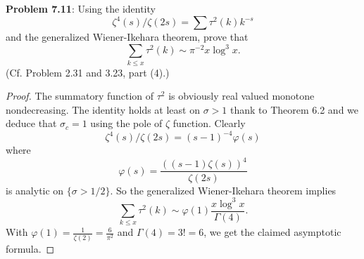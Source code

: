 \documentclass[12pt]{article}
\begin{document}
\fi

\textbf{Problem 7.11}: Using the identity
$$\zeta^4(s)/\zeta(2s) = \sum \tau^2(k) k^{-s}$$
and the generalized Wiener-Ikehara theorem, prove that
$$\sum_{k \leq x} \tau^2(k) \sim \pi^{-2} x \log^3 x.$$
(Cf. Problem 2.31 and 3.23, part (4).)

\begin{proof}
The summatory function of $\tau^2$ is obviously real valued monotone nondecreasing. The identity holds at least on $\sigma > 1$ thank to Theorem 6.2 and we deduce that $\sigma_c = 1$ using the pole of $\zeta$ function. Clearly
$$\zeta^4(s) / \zeta(2s) = (s-1)^{-4} \varphi(s)$$
where
$$\varphi(s) = \frac{((s-1) \zeta(s))^4}{\zeta(2s)}$$
is analytic on $\{\sigma > 1/2\}$. So the generalized Wiener-Ikehara theorem implies
$$\sum_{k \leq x} \tau^2(k) \sim \varphi(1) \frac{x \log^3 x}{\Gamma(4)}.$$
With $\varphi(1) = \frac{1}{\zeta(2)} = \frac{6}{\pi^2}$
and $\Gamma(4) = 3! = 6$, we get the claimed asymptotic formula.
\end{proof}

\unless\ifdefined\IsMainDocument
\end{document}
